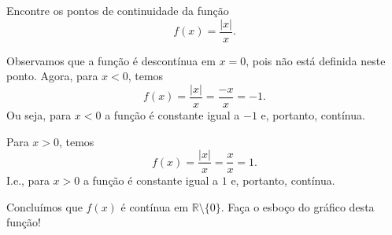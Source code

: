 \begin{exeresol}
  Encontre os pontos de continuidade da função
  \begin{equation}
    f(x) = \frac{|x|}{x}.
  \end{equation}
\end{exeresol}
\begin{resol}
  Observamos que a função é descontínua em $x=0$, pois não está definida neste ponto. Agora, para $x < 0$, temos
  \begin{equation}
    f(x) = \frac{|x|}{x} = \frac{-x}{x} = -1.
  \end{equation}
  Ou seja, para $x<0$ a função é constante igual a $-1$ e, portanto, contínua.

  Para $x > 0$, temos
  \begin{equation}
    f(x) = \frac{|x|}{x} = \frac{x}{x} = 1.
  \end{equation}
  I.e., para $x > 0$ a função é constante igual a $1$ e, portanto, contínua.

  Concluímos que $f(x)$ é contínua em $\mathbb{R}\setminus\{0\}$. Faça o esboço do gráfico desta função!
\end{resol}

